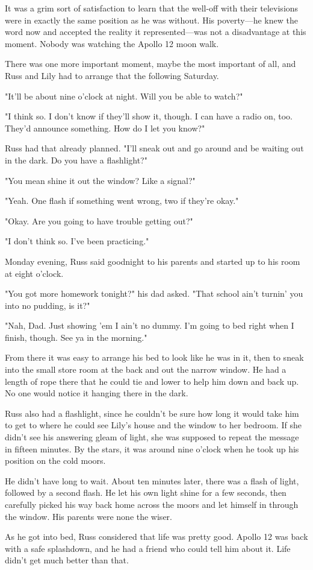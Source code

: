 It was a grim sort of satisfaction to learn that the well-off with their televisions were in exactly the same position as he was without. His poverty—he knew the word now and accepted the reality it represented—was not a disadvantage at this moment. Nobody was watching the Apollo 12 moon walk.

There was one more important moment, maybe the most important of all, and Russ and Lily had to arrange that the following Saturday.

"It'll be about nine o'clock at night. Will you be able to{\el} watch?"

"I think so. I don't know if they'll show it, though. I can have a radio on, too. They'd announce something. How do I let you know?"

Russ had that already planned. "I'll sneak out and go around and be{\el} waiting out in the dark. Do you have a flashlight?"

"You mean shine it out the window? Like a signal?"

"Yeah. One flash if something went{\el} wrong, two if they're okay."

"Okay. Are you going to have trouble getting out?"

"I don't think so. I've been practicing."

Monday evening, Russ said goodnight to his parents and started up to his room at eight o'clock.

"You got more homework tonight?" his dad asked. "That school ain't turnin' you into no pudding, is it?"

"Nah, Dad. Just showing 'em I ain't no dummy. I'm going to bed right when I finish, though. See ya in the morning."

From there it was easy to arrange his bed to look like he was in it, then to sneak into the small store room at the back and out the narrow window. He had a length of rope there that he could tie and lower to help him down and back up. No one would notice it hanging there in the dark.

Russ also had a flashlight, since he couldn't be sure how long it would take him to get to where he could see Lily's house and the window to her bedroom. If she didn't see his answering gleam of light, she was supposed to repeat the message in fifteen minutes. By the stars, it was around nine o'clock when he took up his position on the cold moors.

He didn't have long to wait. About ten minutes later, there was a flash of light, followed by a second flash. He let his own light shine for a few seconds, then carefully picked his way back home across the moors and let himself in through the window. His parents were none the wiser.

As he got into bed, Russ considered that life was pretty good. Apollo 12 was back with a safe splashdown, and he had a friend who could tell him about it. Life didn't get much better than that.
